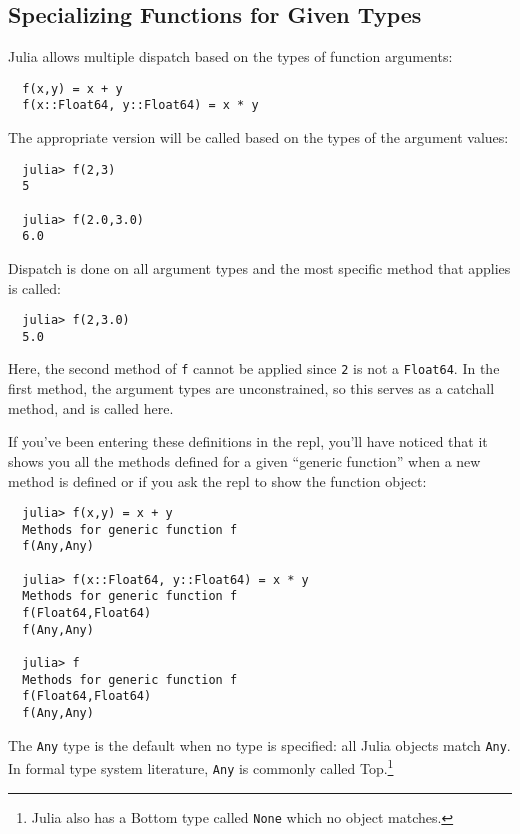\documentclass{article}
\begin{document}
\subsection{Specializing Functions for Given Types}

Julia allows multiple dispatch based on the types of function arguments:
\begin{verbatim}
  f(x,y) = x + y
  f(x::Float64, y::Float64) = x * y
\end{verbatim}
The appropriate version will be called based on the types of the argument values:
\begin{verbatim}
  julia> f(2,3)
  5

  julia> f(2.0,3.0)
  6.0
\end{verbatim}
Dispatch is done on all argument types and the most specific method that applies is called:
\begin{verbatim}
  julia> f(2,3.0)
  5.0
\end{verbatim}
Here, the second method of \verb|f| cannot be applied since \verb|2| is not a \verb|Float64|.
In the first method, the argument types are unconstrained, so this serves as a catchall method, and is called here.

If you've been entering these definitions in the repl, you'll have noticed that it shows you all the methods defined for a given ``generic function'' when a new method is defined or if you ask the repl to show the function object:
\begin{verbatim}
  julia> f(x,y) = x + y
  Methods for generic function f
  f(Any,Any)

  julia> f(x::Float64, y::Float64) = x * y
  Methods for generic function f
  f(Float64,Float64)
  f(Any,Any)

  julia> f
  Methods for generic function f
  f(Float64,Float64)
  f(Any,Any)
\end{verbatim}
The \verb|Any| type is the default when no type is specified:
all Julia objects match \verb|Any|.
In formal type system literature, \verb|Any| is commonly called Top.\footnote{Julia also has a Bottom type called \texttt{None} which no object matches.}
\end{document}
